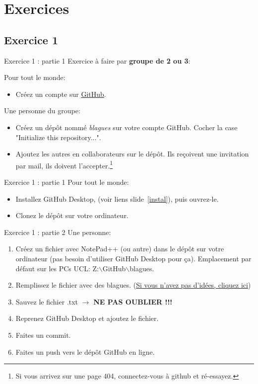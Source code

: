 \documentclass{beamer}
\begin{document}
\section{Exercices}
\subsection{Exercice 1}
\begin{frame}{Exercice 1 : partie 1}
Exercice à faire par \textbf{groupe de 2 ou 3}:

Pour tout le monde:
\begin{itemize}
    \item Créez un compte sur \href{https://github.com}{GitHub}.
\end{itemize}
Une personne du groupe:
\begin{itemize}
    \item Créez un dépôt nommé \textit{blagues} sur votre compte GitHub. Cocher la case "Initialize this repository...".
    \item Ajoutez les autres en collaborateurs sur le dépôt. Ils reçoivent
        une invitation par mail, ils doivent l'accepter.\footnote{Si vous arrivez sur une page 404, connectez-vous à github et ré-essayez.}
\end{itemize}
\end{frame}
\begin{frame}{Exercice 1 : partie 1}
Pour tout le monde:
\begin{itemize}
    \item Installez GitHub Desktop, (voir liens slide~\ref{instal}), puis ouvrez-le.
    \item Clonez le dépôt sur votre ordinateur.
\end{itemize}
\end{frame}

\begin{frame}{Exercice 1 : partie 2}
    Une personne:
    \begin{enumerate}
        \item Créez un fichier avec NotePad++ (ou autre)
            dans le dépôt sur votre ordinateur (pas besoin d'utiliser
            GitHub Desktop pour ça). Emplacement par défaut sur les PCs UCL:
            Z:$\backslash$GitHub$\backslash$blagues.
        \item Remplissez le fichier avec des blagues.
            (\href{https://linuxfr.org/news/blagues-d-informaticiens}{Si vous
            n'avez pas d'idées, cliquez ici})
        \item Sauvez le fichier .txt $\rightarrow$ \textbf{NE PAS OUBLIER !!!}
        \item Reprenez GitHub Desktop et ajoutez le fichier.
        \item Faites un commit.
        \item Faites un push vers le dépôt GitHub en ligne.
    \end{enumerate}
\end{frame}
\end{document}
